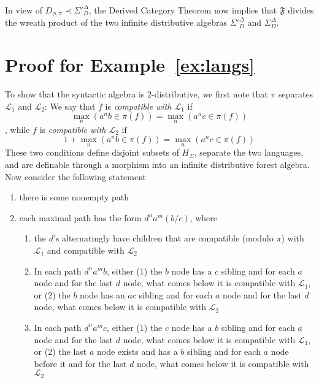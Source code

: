 \documentclass[sigplan,9pt]{acmart}\settopmatter{printfolios=true,printccs=false,printacmref=false}
\theoremstyle{definition}
\newcommand{\La}[0]{{\mathcal{L}}}
\newcommand{\Ff}[0]{{\mathfrak{F}}}
\newcommand{\freedisth}[0]{{H_\Sigma^D}}
\begin{document}
In view of $D_{\phi,\pi} \prec \Sigma'^\Delta_D$, the Derived Category Theorem now implies that $\Ff$ divides the wreath product of the two infinite distributive algebras $\Sigma'^\Delta_D$ and $\Sigma^\Delta_D$.

\newpage
\section{Proof for Example~\ref{ex:langs}}\label{sec:proof-ex}

To show that the syntactic algebra is 2-distributive, we first note that $\pi$ separates $\La_1$ and $\La_2$:
We say that $f$ is \emph{compatible with $\La_1$} if \[\max_n \left(a^nb \in \pi(f)\right) = \max_n \left(a^nc \in \pi(f)\right)\], while $f$ is \emph{compatible with $\La_2$} if \[1+\max_n \left(a^nb \in \pi(f)\right) = \max_n \left(a^nc \in \pi(f)\right)\]
These two conditions define disjoint subsets of $H_\Sigma$, separate the two languages, and are definable through a morphism into an infinite distributive forest algebra.
Now consider the following statement

\begin{enumerate}
\item there is some nonempty path

\item each maximal path has the form $d^n a^m (b/c)$, where

\begin{enumerate}
\item the $d$'s alternatingly have children that are compatible (modulo $\pi$) with $\La_1$ and compatible with $\La_2$

\item In each path $d^n a^m b$, either (1) the $b$ node has a $c$ sibling and for each $a$ node and for the last $d$ node, what comes below it is compatible with $\La_1$, or (2) the $b$ node has an $ac$ sibling and for each $a$ node and for the last $d$ node, what comes below it is compatible with $\La_2$

\item In each path $d^n a^m c$, either (1) the $c$ node has a $b$ sibling and for each $a$ node and for the last $d$ node, what comes below it is compatible with $\La_1$, or (2) the last $a$ node exists and has a $b$ sibling and for each $a$ node before it and for the last $d$ node, what comes below it is compatible with $\La_2$
\end{enumerate}
\end{enumerate}
\end{document}
